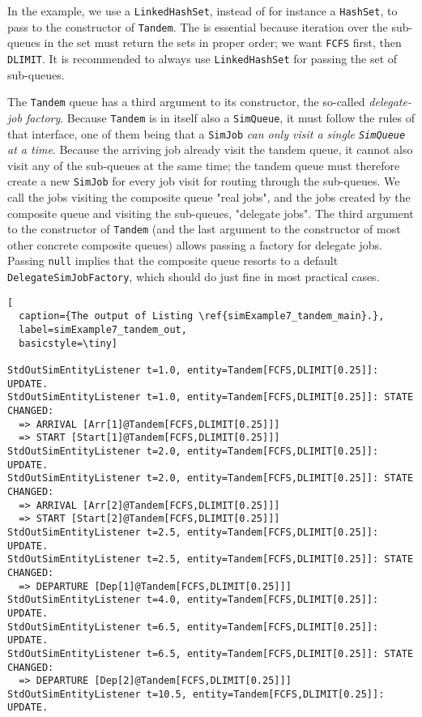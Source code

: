 In the example, we use a \lstinline|LinkedHashSet|,
  instead of for instance a \lstinline|HashSet|,
  to pass to the constructor of \lstinline|Tandem|.
The is essential because iteration over the sub-queues
  in the set must return the sets in proper order;
  we want \lstinline|FCFS| first, then \lstinline|DLIMIT|.
It is recommended to always use \lstinline|LinkedHashSet|
  for passing the set of sub-queues.

The \lstinline|Tandem| queue has a third argument to
  its constructor, the so-called {\em delegate-job factory}.
Because \lstinline|Tandem| is in itself also a \lstinline|SimQueue|,
  it must follow the rules of that interface,
  one of them being that a \lstinline|SimJob|
  {\em can only visit a single \lstinline|SimQueue| at a time}.
Because the arriving job already visit the tandem queue,
  it cannot also visit any of the sub-queues at the same time;
  the tandem queue must therefore create a new \lstinline|SimJob|
  for every job visit for routing through the sub-queues.
We call the jobs visiting the composite queue "real jobs",
  and the jobs created by the composite queue and visiting
  the sub-queues, "delegate jobs".
The third argument to the constructor of \lstinline|Tandem|
  (and the last argument to the constructor of most other
  concrete composite queues)
  allows passing a factory for delegate jobs.
Passing \lstinline|null| implies that the composite queue
  resorts to a default \lstinline|DelegateSimJobFactory|,
  which should do just fine in most practical cases.

\begin{lstfloat}
\begin{lstlisting}[
  caption={The output of Listing \ref{simExample7_tandem_main}.},
  label=simExample7_tandem_out,
  basicstyle=\tiny]

StdOutSimEntityListener t=1.0, entity=Tandem[FCFS,DLIMIT[0.25]]: UPDATE.
StdOutSimEntityListener t=1.0, entity=Tandem[FCFS,DLIMIT[0.25]]: STATE CHANGED:
  => ARRIVAL [Arr[1]@Tandem[FCFS,DLIMIT[0.25]]]
  => START [Start[1]@Tandem[FCFS,DLIMIT[0.25]]]
StdOutSimEntityListener t=2.0, entity=Tandem[FCFS,DLIMIT[0.25]]: UPDATE.
StdOutSimEntityListener t=2.0, entity=Tandem[FCFS,DLIMIT[0.25]]: STATE CHANGED:
  => ARRIVAL [Arr[2]@Tandem[FCFS,DLIMIT[0.25]]]
  => START [Start[2]@Tandem[FCFS,DLIMIT[0.25]]]
StdOutSimEntityListener t=2.5, entity=Tandem[FCFS,DLIMIT[0.25]]: UPDATE.
StdOutSimEntityListener t=2.5, entity=Tandem[FCFS,DLIMIT[0.25]]: STATE CHANGED:
  => DEPARTURE [Dep[1]@Tandem[FCFS,DLIMIT[0.25]]]
StdOutSimEntityListener t=4.0, entity=Tandem[FCFS,DLIMIT[0.25]]: UPDATE.
StdOutSimEntityListener t=6.5, entity=Tandem[FCFS,DLIMIT[0.25]]: UPDATE.
StdOutSimEntityListener t=6.5, entity=Tandem[FCFS,DLIMIT[0.25]]: STATE CHANGED:
  => DEPARTURE [Dep[2]@Tandem[FCFS,DLIMIT[0.25]]]
StdOutSimEntityListener t=10.5, entity=Tandem[FCFS,DLIMIT[0.25]]: UPDATE.

\end{lstlisting}
\end{lstfloat}

